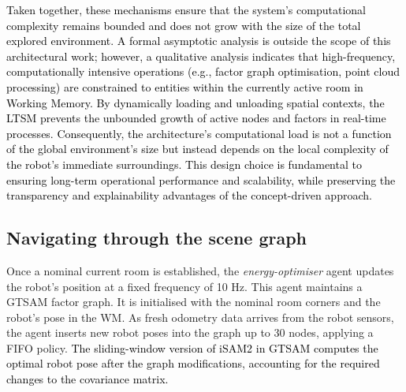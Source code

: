 \documentclass[10pt,a4paper]{article}
\begin{document}
\textcolor{black}{Taken together, these mechanisms ensure that the system's computational complexity remains bounded and does not grow with the size of the total explored environment. A formal asymptotic analysis is outside the scope of this architectural work; however, a qualitative analysis indicates that high-frequency, computationally intensive operations (e.g., factor graph optimisation, point cloud processing) are constrained to entities within the currently active room in Working Memory. By dynamically loading and unloading spatial contexts, the LTSM prevents the unbounded growth of active nodes and factors in real-time processes. \textcolor{black}{Consequently, the architecture's computational load is not a function of the global environment's size but instead depends on the local complexity of the robot's immediate surroundings.} This design choice is fundamental to ensuring long-term operational performance and scalability, while preserving the transparency and explainability advantages of the concept-driven approach.}


\subsection{Navigating through the scene graph}

Once a nominal current room is established, the \textit{energy-optimiser} agent updates the robot’s position at a fixed frequency of 10 Hz. This agent maintains a GTSAM factor graph. It is initialised with the nominal room corners and the robot’s pose in the WM. As fresh odometry data arrives from the robot sensors, the agent inserts new robot poses into the graph up to 30 nodes, applying a FIFO policy. \textcolor{black}{The sliding-window version of iSAM2 in GTSAM computes the optimal robot pose after the graph modifications, accounting for the required changes to the covariance matrix.} 

\par

%
\end{document}
